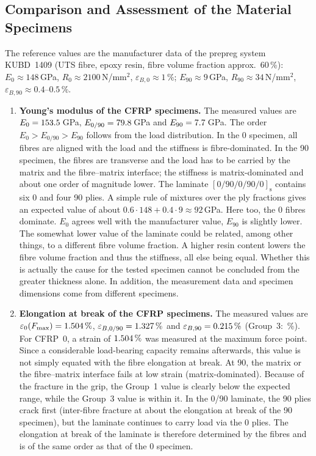 \documentclass[11pt,a4paper]{article}
\newcommand{\eps}{\varepsilon}
\newcommand{\Fmax}{F_{\mathrm{max}}}
\begin{document}
\subsection{Comparison and Assessment of the Material Specimens}

The reference values are the manufacturer data of the prepreg system KUBD~1409
(UTS fibre, epoxy resin, fibre volume fraction approx.\ 60\,\%):
$E_{0} \approx 148$\,GPa, $R_{0} \approx 2100$\,N/mm$^2$,
$\eps_{B,0} \approx 1\,\%$; $E_{90} \approx 9$\,GPa,
$R_{90} \approx 34$\,N/mm$^2$, $\eps_{B,90} \approx 0.4$--$0.5\,\%$.

\begin{enumerate}[label=(\alph*)]
\item \textbf{Young's modulus of the CFRP specimens.} The measured values are
$E_{0} = 153.5$\,GPa, $E_{0/90} = 79.8$\,GPa and
$E_{90} = 7.7$\,GPa. The order $E_{0} > E_{0/90} > E_{90}$ follows
from the load distribution. In the 0\textdegree{} specimen, all fibres are
aligned with the load and the stiffness is fibre-dominated. In the
90\textdegree{} specimen, the fibres are transverse and the load has to be
carried by the matrix and the fibre--matrix interface; the stiffness is
matrix-dominated and about one order of magnitude lower. The laminate
$[0/90/0/90/0]_\mathrm{s}$ contains six 0\textdegree{} and four
90\textdegree{} plies. A simple rule of mixtures over the ply fractions gives
an expected value of about $0.6 \cdot 148 + 0.4 \cdot 9 \approx 92$\,GPa. Here
too, the 0\textdegree{} fibres dominate. $E_0$ agrees well with the
manufacturer value, $E_{90}$ is slightly lower. The somewhat lower value of the
laminate could be related, among other things, to a different fibre volume
fraction. A higher resin content lowers the fibre volume fraction and thus
the stiffness, all else being equal. Whether this is actually the cause for
the tested specimen cannot be concluded from the greater thickness alone. In
addition, the measurement data and specimen dimensions come from different
specimens.

\item \textbf{Elongation at break of the CFRP specimens.} The measured values
are $\eps_0(\Fmax) = \RCFKnullepsB\,\%$,
$\eps_{B,0/90} = \RCFKnullneunzigepsB\,\%$ and
$\eps_{B,90} = \RCFKneunzigepsB\,\%$ (Group~3: \RGdreiEpsBNeunzig\,\%). For
CFRP~0\textdegree{}, a strain of $1.504\,\%$ was measured at the
maximum force point. Since a considerable load-bearing capacity remains
afterwards, this value is not simply equated with the fibre elongation at
break. At 90\textdegree{}, the matrix or the fibre--matrix interface fails at
low strain (matrix-dominated). Because of the fracture in the grip, the
Group~1 value is clearly below the expected range, while the Group~3 value is
within it. In the 0\textdegree/90\textdegree{} laminate, the 90\textdegree{}
plies crack first (inter-fibre fracture at about the elongation at break of
the 90\textdegree{} specimen), but the laminate continues to carry load via
the 0\textdegree{} plies. The elongation at break of the laminate is therefore
determined by the fibres and is of the same order as that of the
0\textdegree{} specimen.


\end{enumerate}
\end{document}
